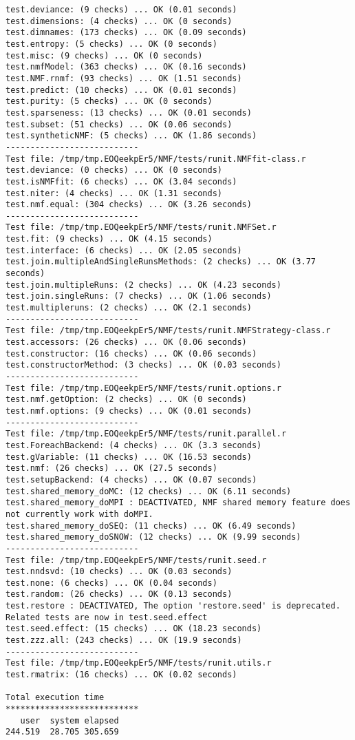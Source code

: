 \documentclass[10pt]{article}
\begin{document}
\begin{verbatim}
test.deviance: (9 checks) ... OK (0.01 seconds)
test.dimensions: (4 checks) ... OK (0 seconds)
test.dimnames: (173 checks) ... OK (0.09 seconds)
test.entropy: (5 checks) ... OK (0 seconds)
test.misc: (9 checks) ... OK (0 seconds)
test.nmfModel: (363 checks) ... OK (0.16 seconds)
test.NMF.rnmf: (93 checks) ... OK (1.51 seconds)
test.predict: (10 checks) ... OK (0.01 seconds)
test.purity: (5 checks) ... OK (0 seconds)
test.sparseness: (13 checks) ... OK (0.01 seconds)
test.subset: (51 checks) ... OK (0.06 seconds)
test.syntheticNMF: (5 checks) ... OK (1.86 seconds)
--------------------------- 
Test file: /tmp/tmp.EOQeekpEr5/NMF/tests/runit.NMFfit-class.r 
test.deviance: (0 checks) ... OK (0 seconds)
test.isNMFfit: (6 checks) ... OK (3.04 seconds)
test.niter: (4 checks) ... OK (1.31 seconds)
test.nmf.equal: (304 checks) ... OK (3.26 seconds)
--------------------------- 
Test file: /tmp/tmp.EOQeekpEr5/NMF/tests/runit.NMFSet.r 
test.fit: (9 checks) ... OK (4.15 seconds)
test.interface: (6 checks) ... OK (2.05 seconds)
test.join.multipleAndSingleRunsMethods: (2 checks) ... OK (3.77 seconds)
test.join.multipleRuns: (2 checks) ... OK (4.23 seconds)
test.join.singleRuns: (7 checks) ... OK (1.06 seconds)
test.multipleruns: (2 checks) ... OK (2.1 seconds)
--------------------------- 
Test file: /tmp/tmp.EOQeekpEr5/NMF/tests/runit.NMFStrategy-class.r 
test.accessors: (26 checks) ... OK (0.06 seconds)
test.constructor: (16 checks) ... OK (0.06 seconds)
test.constructorMethod: (3 checks) ... OK (0.03 seconds)
--------------------------- 
Test file: /tmp/tmp.EOQeekpEr5/NMF/tests/runit.options.r 
test.nmf.getOption: (2 checks) ... OK (0 seconds)
test.nmf.options: (9 checks) ... OK (0.01 seconds)
--------------------------- 
Test file: /tmp/tmp.EOQeekpEr5/NMF/tests/runit.parallel.r 
test.ForeachBackend: (4 checks) ... OK (3.3 seconds)
test.gVariable: (11 checks) ... OK (16.53 seconds)
test.nmf: (26 checks) ... OK (27.5 seconds)
test.setupBackend: (4 checks) ... OK (0.07 seconds)
test.shared_memory_doMC: (12 checks) ... OK (6.11 seconds)
test.shared_memory_doMPI : DEACTIVATED, NMF shared memory feature does not currently work with doMPI.
test.shared_memory_doSEQ: (11 checks) ... OK (6.49 seconds)
test.shared_memory_doSNOW: (12 checks) ... OK (9.99 seconds)
--------------------------- 
Test file: /tmp/tmp.EOQeekpEr5/NMF/tests/runit.seed.r 
test.nndsvd: (10 checks) ... OK (0.03 seconds)
test.none: (6 checks) ... OK (0.04 seconds)
test.random: (26 checks) ... OK (0.13 seconds)
test.restore : DEACTIVATED, The option 'restore.seed' is deprecated. Related tests are now in test.seed.effect
test.seed.effect: (15 checks) ... OK (18.23 seconds)
test.zzz.all: (243 checks) ... OK (19.9 seconds)
--------------------------- 
Test file: /tmp/tmp.EOQeekpEr5/NMF/tests/runit.utils.r 
test.rmatrix: (16 checks) ... OK (0.02 seconds)

Total execution time
***************************
   user  system elapsed 
244.519  28.705 305.659 

\end{verbatim}
\end{document}
